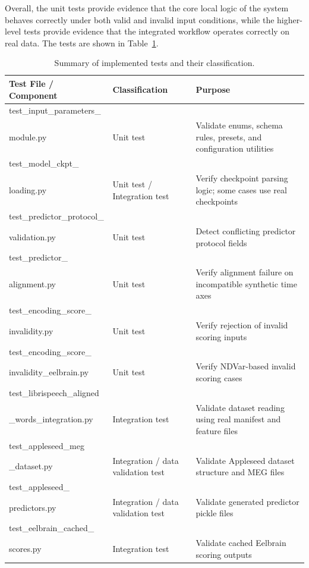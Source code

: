 \documentclass[12pt, titlepage]{article}
\begin{document}
Overall, the unit tests provide evidence that the core local logic of the system behaves correctly under both valid and invalid input conditions, while the higher-level tests provide evidence that the integrated workflow operates correctly on real data. The tests are shown in Table~\ref{tab:unit-test-summary}.


\begin{table}[H]
\centering
\caption{Summary of implemented tests and their classification.}
\label{tab:unit-test-summary}
\begin{tabular}{p{5.0cm} p{3.0cm} p{5.0cm}}
\toprule
\textbf{Test File / Component} & \textbf{Classification} & \textbf{Purpose} \\
\midrule
test\_input\_parameters\_\\module.py & Unit test & Validate enums, schema rules, presets, and configuration utilities \\
test\_model\_ckpt\_\\loading.py & Unit test / Integration test & Verify checkpoint parsing logic; some cases use real checkpoints \\
test\_predictor\_protocol\_\\validation.py\ & Unit test & Detect conflicting predictor protocol fields \\
test\_predictor\_\\alignment.py & Unit test & Verify alignment failure on incompatible synthetic time axes \\
test\_encoding\_score\_\\invalidity.py & Unit test & Verify rejection of invalid scoring inputs \\
test\_encoding\_score\_\\invalidity\_eelbrain.py & Unit test & Verify NDVar-based invalid scoring cases \\
test\_librispeech\_aligned\\\_words\_integration.py & Integration test & Validate dataset reading using real manifest and feature files \\
test\_appleseed\_meg\\\_dataset.py & Integration / data validation test & Validate Appleseed dataset structure and MEG files \\
test\_appleseed\_\\predictors.py & Integration / data validation test & Validate generated predictor pickle files \\
test\_eelbrain\_cached\_\\scores.py & Integration test & Validate cached Eelbrain scoring outputs \\
\bottomrule
\end{tabular}
\end{table}
\end{document}
